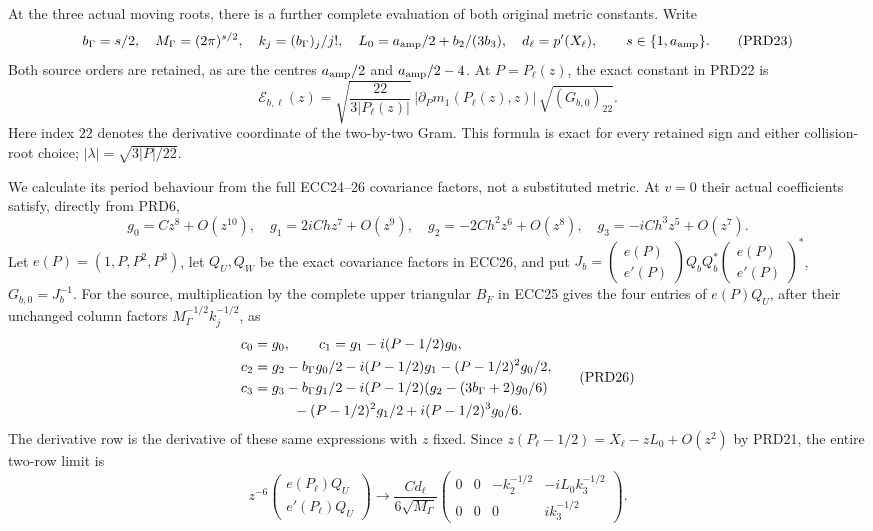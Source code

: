 At the three actual moving roots, there is a further complete
evaluation of both original metric constants. Write
\[
 b_\Gamma=s/2,\quad M_\Gamma=(2\pi)^{s/2},\quad
 k_j=(b_\Gamma)_j/j!,\quad
 L_0=a_{\rm amp}/2+b_2/(3b_3),\quad
 d_\ell=p'(X_\ell),
 \qquad s\in\{1,a_{\rm amp}\}.
 \tag{PRD23}
\]
Both source orders are retained, as are the centres
$a_{\rm amp}/2$ and $a_{\rm amp}/2-4$.
At $P=P_\ell(z)$, the exact constant in PRD22 is
\[
 \mathcal E_{b,\ell}(z)=
 \sqrt{\frac{22}{3|P_\ell(z)|}}\,
 |\partial_Pm_1(P_\ell(z),z)|\,
                  \sqrt{(G_{b,0})_{22}}.
 \tag{PRD24}
\]
Here index $22$ denotes the derivative coordinate of the two-by-two
Gram. This formula is exact for every retained sign and either
collision-root choice; $|\lambda|=\sqrt{3|P|/22}$.

We calculate its period behaviour from the full ECC24--26
covariance factors, not a substituted metric. At $v=0$ their
actual coefficients satisfy, directly from PRD6,
\[
 g_0=Cz^8+O(z^{10}),\quad
 g_1=2iChz^7+O(z^9),\quad
 g_2=-2Ch^2z^6+O(z^8),\quad
 g_3=-iCh^3z^5+O(z^7).
 \tag{PRD25}
\]
Let $e(P)=(1,P,P^2,P^3)$, let $Q_U,Q_W$ be the exact
covariance factors in ECC26, and put
$J_b=\left(\begin{smallmatrix}e(P)\\e'(P)\end{smallmatrix}\right)
Q_bQ_b^*
\left(\begin{smallmatrix}e(P)\\e'(P)\end{smallmatrix}\right)^*$,
$G_{b,0}=J_b^{-1}$.
For the source, multiplication by the complete upper triangular
$B_F$ in ECC25 gives the four entries of $e(P)Q_U$, after their
unchanged column factors $M_\Gamma^{-1/2}k_j^{-1/2}$, as
\[
\begin{split}
 c_0&=g_0,\qquad c_1=g_1-i(P-1/2)g_0,\\
 c_2&=g_2-b_\Gamma g_0/2-i(P-1/2)g_1
                                      -(P-1/2)^2g_0/2,\\
 c_3&=g_3-b_\Gamma g_1/2
       -i(P-1/2)(g_2-(3b_\Gamma+2)g_0/6)\\
    &\hspace{10mm}-(P-1/2)^2g_1/2+i(P-1/2)^3g_0/6.
\end{split}\tag{PRD26}
\]
The derivative row is the derivative of these same expressions
with $z$ fixed. Since
$z(P_\ell-1/2)=X_\ell-zL_0+O(z^2)$ by PRD21,
the entire two-row limit is
\[
 z^{-6}\begin{pmatrix}e(P_\ell)Q_U\\e'(P_\ell)Q_U\end{pmatrix}
 \longrightarrow
 \frac{Cd_\ell}{6\sqrt{M_\Gamma}}
 \begin{pmatrix}
 0&0&-k_2^{-1/2}&-iL_0k_3^{-1/2}\\
 0&0&0&i k_3^{-1/2}
 \end{pmatrix}.
 \tag{PRD27}
\]

